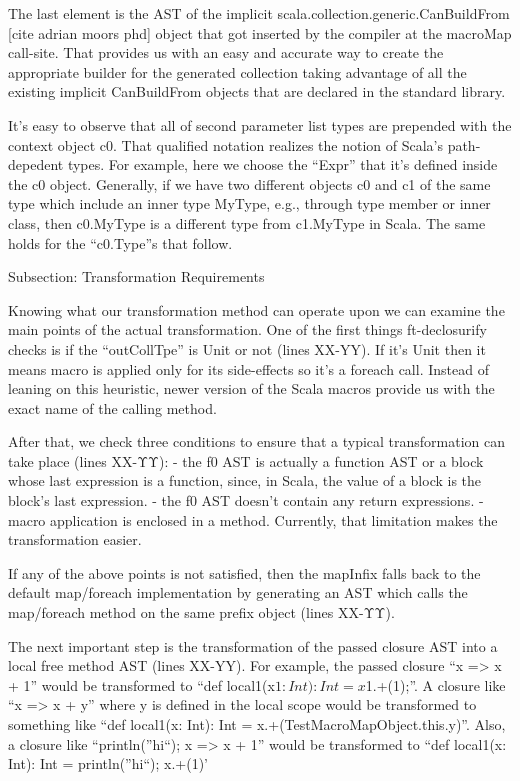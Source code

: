 The last element is the AST of the implicit
scala.collection.generic.CanBuildFrom [cite adrian moors phd] object that got
inserted by the compiler at the macroMap call-site. That provides us with an
easy and accurate way to create the appropriate builder for the generated
collection taking advantage of all the existing implicit CanBuildFrom objects
that are declared in the standard library.

It's easy to observe that all of second parameter list types are prepended
with the context object c0. That qualified notation realizes the notion of
Scala's path-depedent types. For example, here we choose the ``Expr'' that it's
defined inside the c0 object. Generally, if we have two different objects c0 and
c1 of the same type which include an inner type MyType, e.g., through type
member or inner class,  then c0.MyType is a different type from c1.MyType in
Scala. The same holds for the ``c0.Type''s that follow.


Subsection: Transformation Requirements

Knowing what our transformation method can operate upon we can examine the
main points of the actual transformation. One of the first things ft-declosurify
checks is if the ``outCollTpe'' is Unit or not (lines XX-YY). If it's Unit then
it means
macro is applied only for its side-effects so it's a foreach call. Instead of
leaning on this heuristic, newer version of the Scala macros provide us with the
exact name of the calling method.

After that, we check three conditions to ensure that a typical
transformation can take place (lines XX-ΥΥ):
- the f0 AST is actually a function AST or a block whose last
expression is a function, since, in Scala, the value of a block is the block's
last expression.
- the f0 AST doesn't contain any return expressions.
- macro application is enclosed in a method. Currently, that limitation makes
the transformation easier.

If any of the above points is not satisfied, then the mapInfix falls back to the
default map/foreach implementation by generating an AST which
calls the map/foreach method on the same prefix object (lines XX-ΥΥ).

The next important step is the transformation of the passed closure AST
into a local free method AST (lines XX-YY). For example, the passed closure ``x
=> x + 1'' would be transformed to ``def local1(x$1: Int): Int = x$1.+(1);''. A
closure like ``x => x + y'' where y is defined in the local scope would be
transformed to something like ``def local1(x: Int): Int =
x.+(TestMacroMapObject.this.y)''. Also, a closure like ``{println(''hi``); x =>
x + 1}'' would be transformed to ``def local1(x: Int): Int = {println(''hi``);
x.+(1)}'


